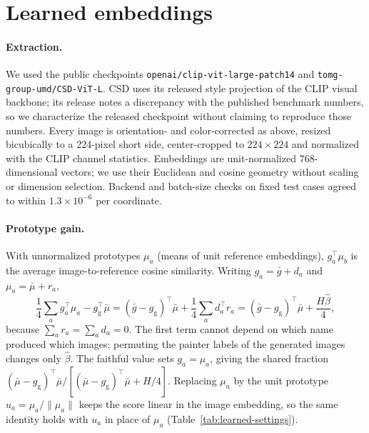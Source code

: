 \FloatBarrier
\section{Learned embeddings}\label{app:learned}

\paragraph{Extraction.} We used the public checkpoints
\texttt{openai/\allowbreak clip-\allowbreak vit-\allowbreak large-\allowbreak patch14} and
\texttt{tomg-\allowbreak group-\allowbreak umd/\allowbreak CSD-\allowbreak ViT-\allowbreak L}. CSD uses its released style projection of the CLIP visual
backbone; its release notes a discrepancy with the published benchmark numbers, so we
characterize the released checkpoint without claiming to reproduce those numbers. Every image
is orientation- and color-corrected as above, resized bicubically to a 224-pixel short side,
center-cropped to $224\times224$ and normalized with the CLIP channel statistics. Embeddings
are unit-normalized 768-dimensional vectors; we use their Euclidean and cosine geometry without
scaling or dimension selection. Backend and batch-size checks on fixed test cases agreed to
within $1.3\times10^{-6}$ per coordinate.

\paragraph{Prototype gain.} With unnormalized prototypes $\mu_a$ (means of unit reference
embeddings), $g_a^\top\mu_b$ is the average image-to-reference cosine similarity. Writing
$g_a=\bar g+d_a$ and $\mu_a=\bar\mu+r_a$,
\begin{equation}
\frac14\sum_a g_a^\top\mu_a-g_{\mathrm g}^\top\bar\mu
=(\bar g-g_{\mathrm g})^\top\bar\mu+\frac14\sum_a d_a^\top r_a
=(\bar g-g_{\mathrm g})^\top\bar\mu+\frac{H\widehat\beta}{4},
\end{equation}
because $\sum_a r_a=\sum_a d_a=0$. The first term cannot depend on which name produced which
images; permuting the painter labels of the generated images changes only $\widehat\beta$. The
faithful value sets $g_a=\mu_a$, giving the shared fraction $(\bar\mu-g_{\mathrm
g})^\top\bar\mu/[(\bar\mu-g_{\mathrm g})^\top\bar\mu+H/4]$. Replacing $\mu_a$ by the unit
prototype $u_a=\mu_a/\|\mu_a\|$ keeps the score linear in the image embedding, so the same
identity holds with $u_a$ in place of $\mu_a$ (Table~\ref{tab:learned-settings}).

